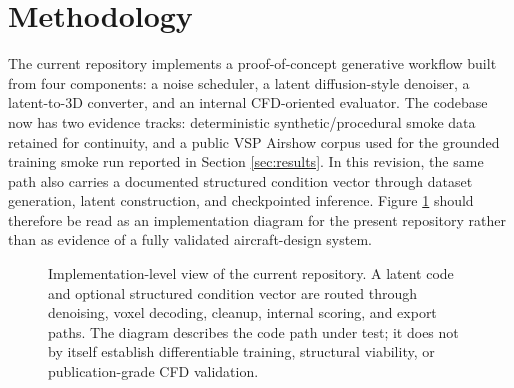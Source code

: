 \section{Methodology}
\label{sec:methodology}
The current repository implements a proof-of-concept generative workflow built from four components: a noise scheduler, a latent diffusion-style denoiser, a latent-to-3D converter, and an internal CFD-oriented evaluator. The codebase now has two evidence tracks: deterministic synthetic/procedural smoke data retained for continuity, and a public VSP Airshow corpus used for the grounded training smoke run reported in Section \ref{sec:results}. In this revision, the same path also carries a documented structured condition vector through dataset generation, latent construction, and checkpointed inference. Figure \ref{fig:architecture} should therefore be read as an implementation diagram for the present repository rather than as evidence of a fully validated aircraft-design system.

\begin{figure}[!t]
\centering
{}
\caption{Implementation-level view of the current repository. A latent code and optional structured condition vector are routed through denoising, voxel decoding, cleanup, internal scoring, and export paths. The diagram describes the code path under test; it does not by itself establish differentiable training, structural viability, or publication-grade CFD validation.}
\label{fig:architecture}
\end{figure}

